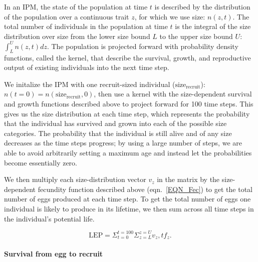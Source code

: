 \documentclass[12pt, oneside]{article}   	%
\begin{document}
In an IPM, the state of the population at time $t$ is described by the distribution of the population over a continuous trait $z$, for which we use size: $n(z,t)$. The total number of individuals in the population at time $t$ is the integral of the size distribution over size from the lower size bound $L$ to the upper size bound $U$: $\int_L^U n(z,t) dz$. The population is projected forward with probability density functions, called the kernel, that describe the survival, growth, and reproductive output of existing individuals into the next time step. 

We initalize the IPM with one recruit-sized individual ($\text{size}_\text{recruit}$): $n(t=0) = n(\text{size}_\text{recruit}, 0)$, then use a kernel with the size-dependent survival and growth functions described above to project forward for 100 time steps. This gives us the size distribution at each time step, which represents the probability that the individual has survived and grown into each of the possible size categories. The probability that the individual is still alive and of any size decreases as the time steps progress; by using a large number of steps, we are able to avoid arbitrarily setting a maximum age and instead let the probabilities become essentially zero. 

We then multiply each size-distribution vector $v_z$ in the matrix by the size-dependent fecundity function described above (eqn.\ \ref{EQN_Fec}) to get the total number of eggs produced at each time step. To get the total number of eggs one individual is likely to produce in its lifetime, we then sum across all time steps in the individual's potential life.  %

 
\begin{equation} %
\text{LEP} = \Sigma_{t=0}^{t=100} \Sigma_{z=L}^{z=U} v_z,t f_z. \label{EQN_LEP}
\end{equation}

\paragraph*{Survival from egg to recruit}
\end{document}
